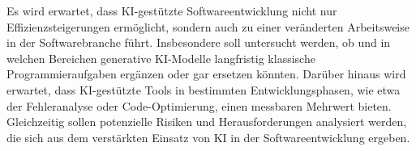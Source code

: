 Es wird erwartet, dass KI-gestützte Softwareentwicklung nicht nur Effizienzsteigerungen ermöglicht, sondern auch zu einer veränderten Arbeitsweise in der Softwarebranche führt. Insbesondere soll untersucht werden, ob und in welchen Bereichen generative KI-Modelle langfristig klassische Programmieraufgaben ergänzen oder gar ersetzen könnten. Darüber hinaus wird erwartet, dass KI-gestützte Tools in bestimmten Entwicklungsphasen, wie etwa der Fehleranalyse oder Code-Optimierung, einen messbaren Mehrwert bieten. Gleichzeitig sollen potenzielle Risiken und Herausforderungen analysiert werden, die sich aus dem verstärkten Einsatz von KI in der Softwareentwicklung ergeben.